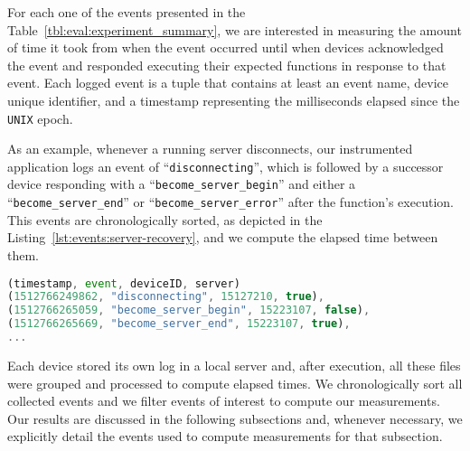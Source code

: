 For each one of the events presented in the Table~\ref{tbl:eval:experiment_summary}, we are interested in measuring the amount of time it took from when the event occurred until when devices acknowledged the event and responded executing their expected functions in response to that event. 
Each logged event is a tuple that contains at least an event name, device unique identifier, and a timestamp representing the milliseconds elapsed since the \texttt{UNIX} epoch.


As an example, whenever a running server disconnects, our instrumented application logs an event of ``{\texttt{disconnecting}}'', which is followed by a successor device responding with a ``{\texttt{become\_server\_begin}}'' and either a ``{\texttt{become\_server\_end}}'' or ``{\texttt{become\_server\_error}}'' after the function's execution. This events are chronologically sorted, as depicted in the Listing~\ref{lst:events:server-recovery}, and we compute the elapsed time between them.

\begin{tiny}
\begin{lstlisting}[caption={Tuples with logged events},label={lst:events:server-recovery}, language=JavaScript]
(timestamp, event, deviceID, server)
(1512766249862, "disconnecting", 15127210, true),
(1512766265059, "become_server_begin", 15223107, false),
(1512766265669, "become_server_end", 15223107, true),
...
\end{lstlisting}    
\end{tiny}


Each device stored its own log in a local server and, after execution, all these files were grouped and processed to compute elapsed times. We chronologically sort all collected events and we filter events of interest to compute our measurements. 
Our results are discussed in the following subsections and, whenever necessary, we explicitly detail the events used to compute measurements for that subsection.



